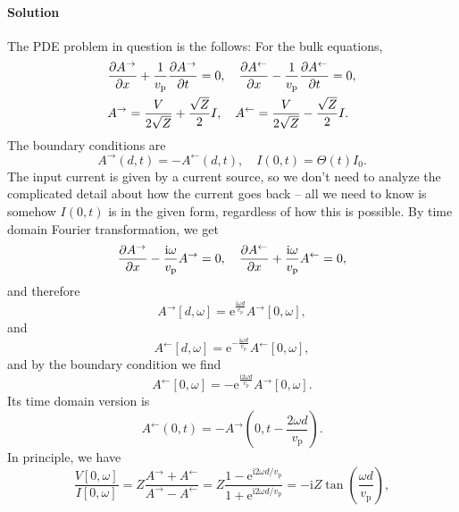 \documentclass[hyperref, a4paper]{article}
\newcommand*{\ii}{\mathrm{i}}
\newcommand*{\ee}{\mathrm{e}}
\begin{document}
\paragraph{Solution} The PDE problem in question is the follows:
For the bulk equations,
\begin{equation}
    \begin{aligned}
        &\pdv{A^\rightarrow}{x} + \frac{1}{v_{\text{p}}} \pdv{A^\rightarrow}{t} = 0, \quad 
         \pdv{A^\leftarrow}{x}  - \frac{1}{v_{\text{p}}} \pdv{A^\leftarrow}{t} = 0, \\
        &A^{\rightarrow} = \frac{V}{2 \sqrt{Z}} + \frac{\sqrt{Z}}{2} I, \quad 
         A^{\leftarrow } = \frac{V}{2 \sqrt{Z}} - \frac{\sqrt{Z}}{2} I.
    \end{aligned}
\end{equation}
The boundary conditions are 
\begin{equation}
    A^{\rightarrow}(d, t) = - A^{\leftarrow}(d, t), \quad 
    I(0, t) = \Theta(t) I_0.
\end{equation}
The input current is given by a current source,
so we don't need to analyze the complicated detail about how the current goes back -- 
all we need to know is somehow $I(0, t)$ is in the given form, regardless of how this is possible.
By time domain Fourier transformation, we get 
\begin{equation}
    \pdv{A^\rightarrow}{x} - \frac{\ii \omega}{v_{\text{p}}} A^{\rightarrow} = 0, \quad 
    \pdv{A^\leftarrow }{x} + \frac{\ii \omega}{v_{\text{p}}} A^{\leftarrow } = 0,
\end{equation}
and therefore 
\[
    A^{\rightarrow}[d, \omega] = \ee^{\frac{\ii \omega d}{v_{\text{p}}}} A^{\rightarrow}[0, \omega],
\]
and 
\[
    A^{\leftarrow}[d, \omega] = \ee^{- \frac{\ii \omega d}{v_{\text{p}}}} A^{\leftarrow}[0, \omega],
\]
and by the boundary condition we find 
\begin{equation}
    A^{\leftarrow}[0, \omega] = - \ee^{\frac{\ii 2 \omega d}{v_{\text{p}}}} A^{\rightarrow}[0, \omega].
\end{equation}
Its time domain version is 
\begin{equation}
    A^{\leftarrow}(0, t) = - A^{\rightarrow}\left(0, t - \frac{2 \omega d}{v_{\text{p}}}\right).
\end{equation}
In principle, we have 
\begin{equation}
    \frac{V[0, \omega]}{I[0, \omega]} = Z \frac{A^{\rightarrow} + A^{\leftarrow}}{A^{\rightarrow} - A^{\leftarrow}}
    = Z \frac{1 - \ee^{\ii 2 \omega d / v_{\text{p}}}}{1 + \ee^{\ii 2 \omega d / v_{\text{p}}}}
    = - \ii Z \tan(\frac{\omega d}{v_{\text{p}}}),
\end{equation}
\end{document}

